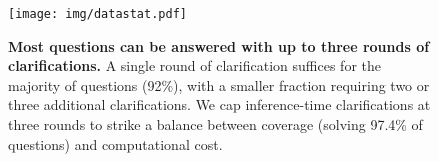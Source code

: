 \begin{figure}[t!]
    \begin{center}
    \texttt{[image: img/datastat.pdf]}
    \end{center}
    \caption{\textbf{Most questions can be answered with up to three rounds of clarifications.} 
    A single round of clarification suffices for the majority of questions (92\%), with a smaller fraction requiring two or three additional clarifications. 
    We cap inference-time clarifications at three rounds to strike a balance between coverage (solving 97.4\% of questions) and computational cost.}
    \label{fig:dataset_stat}
\end{figure}